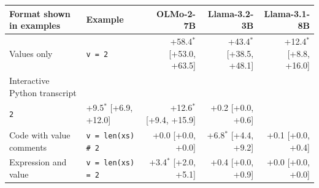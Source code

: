 \begin{tabular}{@{}llrrr@{}}
\toprule
Format shown in examples & Example & OLMo-2-7B & Llama-3.2-3B & Llama-3.1-8B \\
\midrule
Values only & \texttt{v = 2} & +58.4$^{*}$ [+53.0, +63.5] & +43.4$^{*}$ [+38.5, +48.1] & +12.4$^{*}$ [+8.8, +16.0] \\
Interactive Python transcript & \shortstack[l]{\texttt{>{}>{}> v}\\\texttt{2}} & +9.5$^{*}$ [+6.9, +12.0] & +12.6$^{*}$ [+9.4, +15.9] & +0.2 [+0.0, +0.6] \\
Code with value comments & \texttt{v = len(xs) \# 2} & +0.0 [+0.0, +0.0] & +6.8$^{*}$ [+4.4, +9.2] & +0.1 [+0.0, +0.4] \\
Expression and value & \texttt{v = len(xs) = 2} & +3.4$^{*}$ [+2.0, +5.1] & +0.4 [+0.0, +0.9] & +0.0 [+0.0, +0.0] \\
\bottomrule
\end{tabular}
